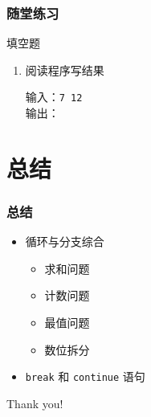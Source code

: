 \begin{frame}[fragile]
    \frametitle{随堂练习}

    \begin{exampleblock}{填空题}

        \begin{enumerate}
            \item 阅读程序写结果
                

                输入：\lstinline|7 12|\\
                输出：
        \end{enumerate}

    \end{exampleblock}
\end{frame}


\section{总结}

\begin{frame}[fragile]
    \frametitle{总结}

    \begin{itemize}
        \item 循环与分支综合
            \begin{itemize}
                \item 求和问题
                \item 计数问题
                \item 最值问题
                \item 数位拆分
            \end{itemize}
        \item \lstinline|break| 和 \lstinline|continue| 语句
    \end{itemize}
\end{frame}

\begin{frame}
    \begin{center}
        {\Huge Thank you!}
    \end{center}
\end{frame}


